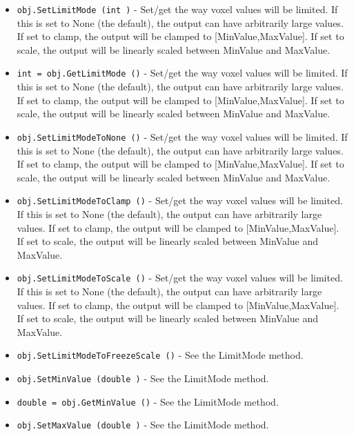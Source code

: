 \begin{itemize}
\item  \verb|obj.SetLimitMode (int )| -  Set/get the way voxel values will be limited.  If this is set to None (the
 default), the output can have arbitrarily large values.  If set to clamp,
 the output will be clamped to [MinValue,MaxValue].  If set to scale, the
 output will be linearly scaled between MinValue and MaxValue.

\item  \verb|int = obj.GetLimitMode ()| -  Set/get the way voxel values will be limited.  If this is set to None (the
 default), the output can have arbitrarily large values.  If set to clamp,
 the output will be clamped to [MinValue,MaxValue].  If set to scale, the
 output will be linearly scaled between MinValue and MaxValue.

\item  \verb|obj.SetLimitModeToNone ()| -  Set/get the way voxel values will be limited.  If this is set to None (the
 default), the output can have arbitrarily large values.  If set to clamp,
 the output will be clamped to [MinValue,MaxValue].  If set to scale, the
 output will be linearly scaled between MinValue and MaxValue.

\item  \verb|obj.SetLimitModeToClamp ()| -  Set/get the way voxel values will be limited.  If this is set to None (the
 default), the output can have arbitrarily large values.  If set to clamp,
 the output will be clamped to [MinValue,MaxValue].  If set to scale, the
 output will be linearly scaled between MinValue and MaxValue.

\item  \verb|obj.SetLimitModeToScale ()| -  Set/get the way voxel values will be limited.  If this is set to None (the
 default), the output can have arbitrarily large values.  If set to clamp,
 the output will be clamped to [MinValue,MaxValue].  If set to scale, the
 output will be linearly scaled between MinValue and MaxValue.

\item  \verb|obj.SetLimitModeToFreezeScale ()| -  See the LimitMode method.

\item  \verb|obj.SetMinValue (double )| -  See the LimitMode method.

\item  \verb|double = obj.GetMinValue ()| -  See the LimitMode method.

\item  \verb|obj.SetMaxValue (double )| -  See the LimitMode method.


\end{itemize}
